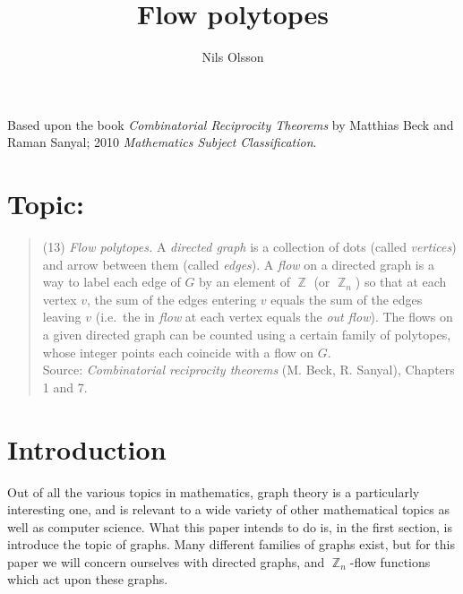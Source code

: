\documentclass{amsart}
\DeclareMathOperator{\Z}{\mathbb{Z}}
\theoremstyle{plain}
\theoremstyle{remark}
\theoremstyle{definition}
\begin{document}
%
%
%

\title{Flow polytopes}
\author{Nils Olsson}
\maketitle

Based upon the book \emph{Combinatorial Reciprocity Theorems} by
Matthias Beck and Raman Sanyal; 2010 \emph{Mathematics Subject Classification}.

\hrulefill

\section*{Topic:}

\noindent
\begin{quote}
  (13) \emph{Flow polytopes.}
  A \emph{directed graph} is a collection of dots (called \emph{vertices}) and
  arrow between them (called \emph{edges}). A \emph{flow} on a directed graph is a
  way to label each edge of $G$ by an element of $\Z$ (or $\Z_n$) so that at each
  vertex $v$, the sum of the edges entering $v$ equals the sum of the edges
  leaving $v$ (i.e.\ the in \emph{flow} at each vertex equals the \emph{out
  flow}). The flows on a given directed graph can be counted using a certain
  family of polytopes, whose integer points each coincide with a flow on $G$.
  \\[1em]
  \noindent
  Source:
  \emph{Combinatorial reciprocity theorems} (M. Beck, R. Sanyal), Chapters 1 and 7.
\end{quote}

\hrulefill

\section*{Introduction}

Out of all the various topics in mathematics, graph theory is a particularly
interesting one, and is relevant to a wide variety of other mathematical
topics as well as computer science.
What this paper intends to do is, in the first section, is introduce the topic
of graphs. Many different families of graphs exist, but for this paper we will
concern ourselves with directed graphs, and $\Z_n$-flow functions which act
upon these graphs.
\end{document}
